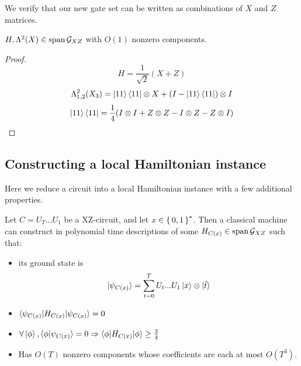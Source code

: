 We verify that our new gate set can be written as combinations of $X$ and $Z$ matrices.

\begin{theorem}
	$H,\Lambda^2(X)\in\operatorname*{\operatorname{span}}\mathcal{G}_{XZ}$ with $O(1)$ nonzero components.
\end{theorem}

\begin{proof}
	$$H=\frac{1}{\sqrt{2}}(X+Z)$$
	$$\Lambda^2_{1,2}(X_3)=\ket{11}\bra{11}\otimes X+(I-\ket{11}\bra{11})\otimes I$$
	$$\ket{11}\bra{11}=\frac{1}{4}(I\otimes I+Z\otimes Z-I\otimes Z-Z\otimes I)$$
\end{proof}

\subsection{Constructing a local Hamiltonian instance}

Here we reduce a circuit into a local Hamiltonian instance with a few additional properties.

\begin{theorem}
	Let $C=U_T\ldots U_1$ be a XZ-circuit, and let $x\in\set{0, 1}^*$. Then a classical machine can construct in polynomial time descriptions of some $H_{C(x)}\in\operatorname*{\operatorname{span}}\mathcal{G}_{XZ}$ such that:
	\begin{itemize}
		\item its ground state is $$\ket{\psi_{C(x)}}=\sum_{t=0}^TU_t...U_1\ket{x}\otimes\ket{\hat{t}}$$
		\item $\braket{\psi_{C(x)}|H_{C(x)}|\psi_{C(x)}}=0$
		\item $\forall\ket\phi,\braket{\phi|\psi_{C(x)}}=0\Rightarrow\braket{\phi|H_{C(x)}|\phi}\geq\frac{3}{4}$
		\item Has $O(T)$ nonzero components whose coefficients are each at most $O(T^3)$.
	\end{itemize}
\end{theorem}

